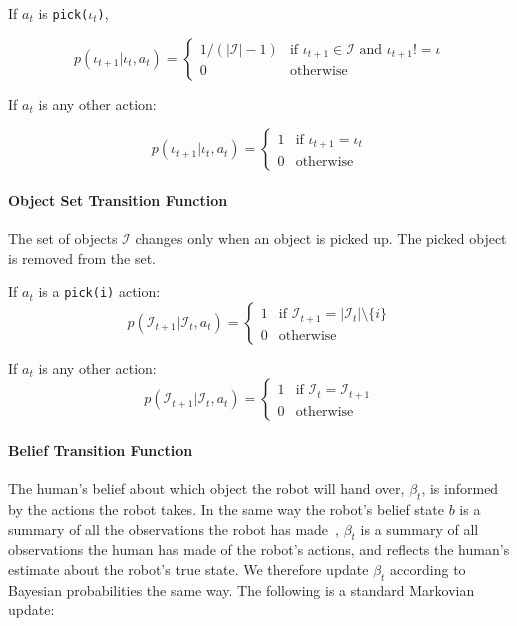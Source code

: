 \documentclass{article}
\newcommand{\Iota}{\mathcal{I}}
\begin{document}
\begin{multicols}{2}
If $a_t$ is \texttt{pick($\iota_t$)}, 

\begin{equation*}
	p(\iota_{t+1} | \iota_t, a_t) = \begin{cases}
		1/(|\Iota|-1) & \text{if } \iota_{t+1} \in \Iota \text{ and } \iota_{t+1} != \iota \\
		0 & \text{otherwise} 
	\end{cases}
\end{equation*}


If $a_t$ is any other action: 

\begin{equation*}
	p(\iota_{t+1} | \iota_t, a_t) = \begin{cases} 
		1 & \text{if $\iota_{t+1} = \iota_t$} \\
		0 & \text{otherwise}
	\end{cases}
\end{equation*}

\paragraph{Object Set Transition Function}

The set of objects $\Iota$ changes only when an object is picked up. The picked object is removed from the set. 

If $a_t$ is a \texttt{pick(i)} action: 
\begin{equation*}
	p(\Iota_{t+1} | \Iota_t, a_t) = \begin{cases}
		1 & \text{if $\Iota_{t+1} = |\Iota_t| \setminus \{i\}$} \\ 
		0 & \text{otherwise}
	\end{cases}
\end{equation*}


If $a_t$ is any other action: 
\begin{equation*}
	p(\Iota_{t+1} | \Iota_t, a_t) = \begin{cases}
		1 & \text{if $\Iota_{t} = \Iota_{t+1}$} \\ 
		0 & \text{otherwise}
	\end{cases}
\end{equation*}

\paragraph{Belief Transition Function}

The human's belief about which object the robot will hand over, $\beta_t$, is informed by the actions the robot takes. In the same way the robot's belief state $b$ is a summary of all the observations the robot has made~\citep{kaelbling99}, $\beta_t$ is a summary of all observations the human has made of the robot's actions, and reflects the human's estimate about the robot's true state. We therefore update $\beta_t$ according to Bayesian probabilities the same way. The following is a standard Markovian update: 


\end{multicols}
\end{document}

